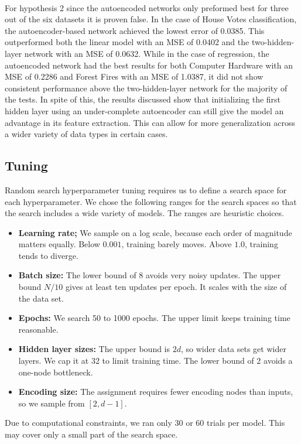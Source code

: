 \documentclass[twoside,11pt]{article}
\begin{document}
\paragraph{}
For hypothesis 2 since the autoencoded networks only preformed best for three out of the six datasets it is proven false. In the case of House Votes classification, the autoencoder-based network achieved the lowest error of 0.0385. This outperformed both the linear model with an MSE of 0.0402 and the two-hidden-layer network with an MSE of 0.0632. While in the case of regression, the autoencoded network had the best results for both Computer Hardware with an MSE of 0.2286 and Forest Fires with an MSE of 1.0387, it did not show consistent performance above the two-hidden-layer network for the majority of the tests. In spite of this, the results discussed show that initializing the first hidden layer using an under-complete autoencoder can still give the model an advantage in its feature extraction. This can allow for more generalization across a wider variety of data types in certain cases.

\subsection{Tuning}
Random search hyperparameter tuning requires us to define a search space for each hyperparameter. We chose the following ranges for the search spaces so that the search includes a wide variety of models. The ranges are heuristic choices.
\begin{itemize}
    \item \textbf{Learning rate;} We sample on a log scale, because each order of magnitude matters equally. Below $0.001$, training barely moves. Above $1.0$, training tends to diverge.
    \item \textbf{Batch size:} The lower bound of 8 avoids very noisy updates. The upper bound $N/10$ gives at least ten updates per epoch. It scales with the size of the data set.
    \item \textbf{Epochs:} We search 50 to 1000 epochs. The upper limit keeps training time reasonable.
    \item \textbf{Hidden layer sizes:} The upper bound is $2d$, so wider data sets get wider layers. We cap it at 32 to limit training time. The lower bound of 2 avoids a one-node bottleneck.
    \item \textbf{Encoding size:} The assignment requires fewer encoding nodes than inputs, so we sample from $[2, d-1]$.
\end{itemize}
Due to computational constraints, we ran only 30 or 60 trials per model. This may cover only a small part of the search space.
\end{document}
